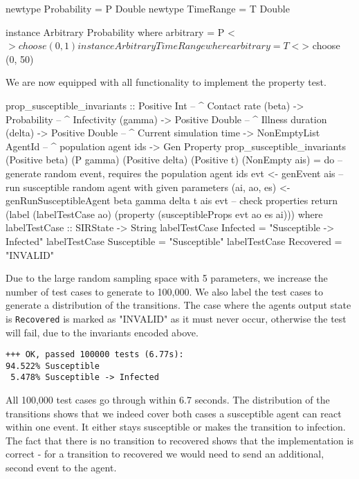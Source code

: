 \begin{HaskellCode}
newtype Probability = P Double
newtype TimeRange   = T Double

instance Arbitrary Probability where
  arbitrary = P <$> choose (0, 1)
  
instance Arbitrary TimeRange where
  arbitrary = T <$> choose (0, 50)
\end{HaskellCode}

We are now equipped with all functionality to implement the property test.

\begin{HaskellCode}
prop_susceptible_invariants :: Positive Int         -- ^ Contact rate (beta)
                            -> Probability          -- ^ Infectivity (gamma)
                            -> Positive Double      -- ^ Illness duration (delta)
                            -> Positive Double      -- ^ Current simulation time
                            -> NonEmptyList AgentId -- ^ population agent ids
                            -> Gen Property
prop_susceptible_invariants 
  (Positive beta) (P gamma) (Positive delta) (Positive t) (NonEmpty ais) = do
  -- generate random event, requires the population agent ids
  evt <- genEvent ais
  -- run susceptible random agent with given parameters
  (ai, ao, es) <- genRunSusceptibleAgent beta gamma delta t ais evt
  -- check properties
  return (label (labelTestCase ao) (property (susceptibleProps evt ao es ai)))
  where
    labelTestCase :: SIRState -> String
    labelTestCase Infected    = "Susceptible -> Infected"
    labelTestCase Susceptible = "Susceptible"
    labelTestCase Recovered   = "INVALID"
\end{HaskellCode}

Due to the large random sampling space with 5 parameters, we increase the number of test cases to generate to 100,000. We also label the test cases to generate a distribution of the transitions. The case where the agents output state is \texttt{Recovered} is marked as "INVALID" as it must never occur, otherwise the test will fail, due to the invariants encoded above.

\begin{verbatim}
+++ OK, passed 100000 tests (6.77s):
94.522% Susceptible
 5.478% Susceptible -> Infected
\end{verbatim}

All 100,000 test cases go through within 6.7 seconds. The distribution of the transitions shows that we indeed cover both cases a susceptible agent can react within one event. It either stays susceptible or makes the transition to infection. The fact that there is no transition to recovered shows that the implementation is correct - for a transition to recovered we would need to send an additional, second event to the agent.

